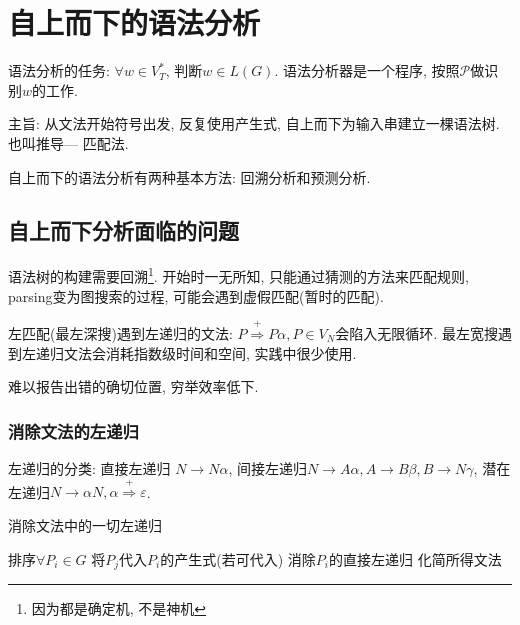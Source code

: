 \chapter{自上而下的语法分析}

    语法分析的任务: $\forall w\in V_T^*$, 判断$w\in L(G)$. 语法分析器是一个程序, 按照$\mathcal{P}$做识别$w$的工作.

    主旨: 从文法开始符号出发, 反复使用产生式, 自上而下为输入串建立一棵语法树. 也叫\textsf{推导--- 匹配法}. 

    自上而下的语法分析有两种基本方法: 回溯分析和预测分析.

    \section{自上而下分析面临的问题}

        语法树的构建需要回溯\footnote{因为都是确定机, 不是神机}. 开始时一无所知, 只能通过猜测的方法来匹配规则, parsing变为图搜索的过程, 可能会遇到虚假匹配(暂时的匹配).

        左匹配(最左深搜)遇到\textsf{左递归}的文法: $P\stackrel{+}{\Rightarrow}P\alpha, P\in V_N$会陷入无限循环. 最左宽搜遇到左递归文法会消耗指数级时间和空间, 实践中很少使用.

        难以报告出错的确切位置, 穷举效率低下.

        \subsection{消除文法的左递归}
        
            \textsf{左递归}的分类: 直接左递归 $N\to N\alpha$, 间接左递归$N\to A\alpha, A\to B\beta, B\to N\gamma$, 潜在左递归$N\to\alpha N, \alpha\stackrel{+}{\Rightarrow}\varepsilon$.

            \begin{algorithm}
                \caption{消除文法中的一切左递归}
                \label{algorithm-eliminate-all-left-recursion}
                \begin{algorithmic}[1]
                        \State 排序$\forall P_i \in G$
                                \State 将$P_j$代入$P_i$的产生式(若可代入)
                            \EndFor
                            \State 消除$P_i$的直接左递归
                        \EndFor
                        \State 化简所得文法
                    \EndProcedure
                \end{algorithmic}
            \end{algorithm}

